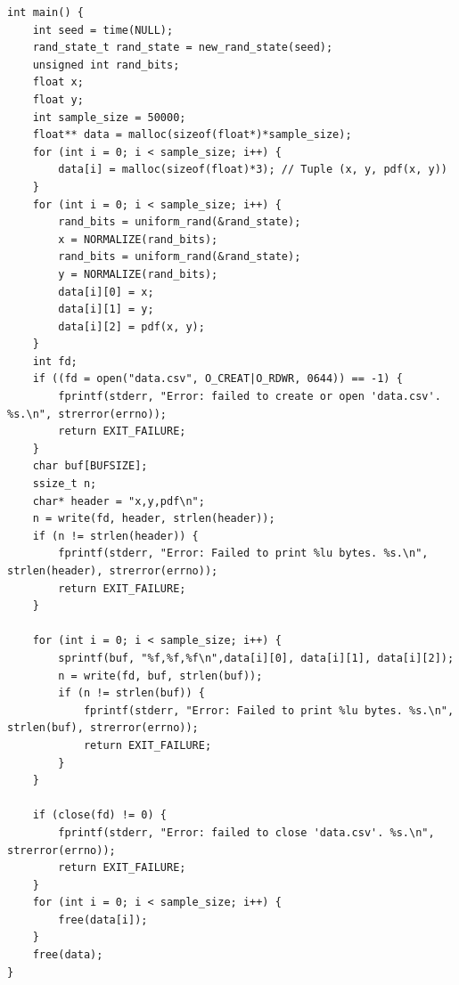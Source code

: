 \documentclass[12pt, letterpaper]{article}
\begin{document}
\begin{verbatim}
int main() {
    int seed = time(NULL);
    rand_state_t rand_state = new_rand_state(seed);
    unsigned int rand_bits;
    float x;
    float y;
    int sample_size = 50000;
    float** data = malloc(sizeof(float*)*sample_size);
    for (int i = 0; i < sample_size; i++) {
        data[i] = malloc(sizeof(float)*3); // Tuple (x, y, pdf(x, y))
    }
    for (int i = 0; i < sample_size; i++) {
        rand_bits = uniform_rand(&rand_state);
        x = NORMALIZE(rand_bits);
        rand_bits = uniform_rand(&rand_state);
        y = NORMALIZE(rand_bits);
        data[i][0] = x;
        data[i][1] = y;
        data[i][2] = pdf(x, y);
    }
    int fd;
    if ((fd = open("data.csv", O_CREAT|O_RDWR, 0644)) == -1) {
        fprintf(stderr, "Error: failed to create or open 'data.csv'. %s.\n", strerror(errno));
        return EXIT_FAILURE;
    }
    char buf[BUFSIZE];
    ssize_t n;
    char* header = "x,y,pdf\n";
    n = write(fd, header, strlen(header));
    if (n != strlen(header)) {
        fprintf(stderr, "Error: Failed to print %lu bytes. %s.\n", strlen(header), strerror(errno));
        return EXIT_FAILURE;
    }
    
    for (int i = 0; i < sample_size; i++) {
        sprintf(buf, "%f,%f,%f\n",data[i][0], data[i][1], data[i][2]);
        n = write(fd, buf, strlen(buf));
        if (n != strlen(buf)) {
            fprintf(stderr, "Error: Failed to print %lu bytes. %s.\n", strlen(buf), strerror(errno));
            return EXIT_FAILURE;
        }
    }

    if (close(fd) != 0) {
        fprintf(stderr, "Error: failed to close 'data.csv'. %s.\n", strerror(errno));
        return EXIT_FAILURE;
    }
    for (int i = 0; i < sample_size; i++) {
        free(data[i]);
    }
    free(data);
}
\end{verbatim}
\end{document}
